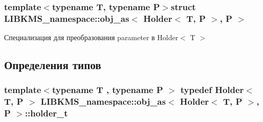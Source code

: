 \subsubsection*{template$<$typename T, typename P$>$struct L\-I\-B\-K\-M\-S\-\_\-namespace\-::obj\-\_\-as$<$ Holder$<$ T, P $>$, P $>$}

Специализация для преобразования parameter в Holder$<$ T $>$ 

\subsection{Определения типов}
\hypertarget{structLIBKMS__namespace_1_1obj__as_3_01Holder_3_01T_00_01P_01_4_00_01P_01_4_aa25f14fd65890cd92986509117d1dd7b}{
\subsubsection[{holder\-\_\-t}]{\setlength{\rightskip}{0pt plus 5cm}template$<$typename T , typename P $>$ typedef {\bf Holder}$<$ T, P $>$ L\-I\-B\-K\-M\-S\-\_\-namespace\-::obj\-\_\-as$<$ {\bf Holder}$<$ T, P $>$, P $>$\-::{\bf holder\-\_\-t}}}\label{structLIBKMS__namespace_1_1obj__as_3_01Holder_3_01T_00_01P_01_4_00_01P_01_4_aa25f14fd65890cd92986509117d1dd7b}


